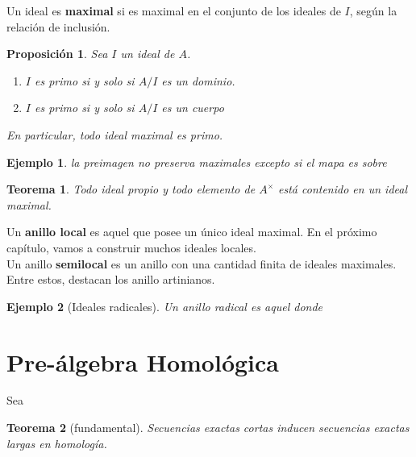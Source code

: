 \documentclass[12pt]{book}
\newtheorem{eje}{Ejemplo}
\newtheorem{teo}{Teorema}
\newtheorem{pro}{Proposición}
\begin{document}
Un ideal es \textbf{maximal} si es maximal en el conjunto de los ideales de $I$, según la relación de inclusión.
\begin{pro} Sea $I$ un ideal de $A$.
\begin{enumerate}
\item $I$ es primo si y solo si $A/I$ es un dominio.
\item $ I $ es primo si y solo si $A/I$ es un cuerpo
\end{enumerate}
En particular, todo ideal maximal es primo.
\end{pro}

\begin{eje}
la preimagen no preserva maximales excepto si el mapa es sobre
\end{eje}

\begin{teo}
Todo ideal propio y todo elemento de $A^{\times}$ está contenido en un ideal maximal.
\end{teo}





Un \textbf{anillo local} es aquel que posee un único ideal maximal. En el próximo capítulo, vamos a construir muchos ideales locales.\\
Un anillo \textbf{semilocal} es un anillo con una cantidad finita de ideales maximales. Entre estos, destacan los anillo artinianos.




\begin{eje}[Ideales radicales]
Un anillo radical es aquel donde 
\end{eje}




\section{Pre-álgebra Homológica}

Sea 

\begin{teo}[fundamental]
	Secuencias exactas cortas inducen secuencias exactas largas en homología.
\end{teo}
\end{document}

